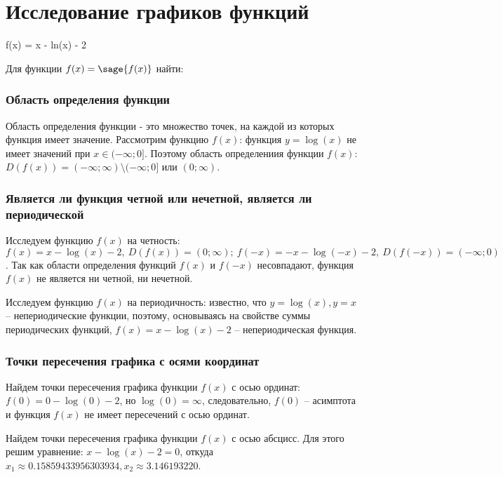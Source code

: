 \documentclass[14pt]{extreport}
\begin{document}
\tableofcontents

\newpage
\section{Исследование графиков функций}

\begin{sagesilent}
    f(x) = x - ln(x) - 2
\end{sagesilent}

Для функции $f(x) = \sage{f(x)}$ найти:

\subsubsection{Область определения функции}

Область определения функции - это множество точек, на каждой из которых функция имеет значение. Рассмотрим
функцию $f(x)$: функция $y = \log{(x)}$ не имеет значений при $x \in (-\infty;0]$. Поэтому
область определениия функции $f(x)$: $D(f(x)) = (-\infty;\infty)\setminus(-\infty;0]$ или $(0;\infty)$.

\subsubsection{Является ли функция четной или нечетной, является ли периодической}

Исследуем функцию $f(x)$ на четность: $f(x) = x - \log{(x)} - 2, ~D(f(x)) = (0;\infty);~
f(-x) = -x - \log{(-x)} - 2,~D(f(-x)) = (-\infty;0)$. Так как области определения функций $f(x)$ и $f(-x)$
несовпадают, функция $f(x)$ не является ни четной, ни нечетной.

Исследуем функцию $f(x)$ на периодичность: известно, что $y = \log{(x)}, y = x$ -- непериодические функции,
поэтому, основываясь на свойстве суммы периодических функций, $f(x) = x - \log{(x)} - 2$ -- непериодическая
функция.

\subsubsection{Точки пересечения графика с осями координат}

Найдем точки пересечения графика функции $f(x)$ с осью ординат: $f(0) = 0 - \log{(0)} - 2$, но $\log{(0)} =
\infty$, следовательно, $f(0)$ -- асимптота и функция $f(x)$ не имеет пересечений с осью ординат.

Найдем точки пересечения графика функции $f(x)$ с осью абсцисс. Для этого решим уравнение: $x - \log{(x)} -
2 = 0$, откуда $x_1 \approx 0.15859433956303934, x_2 \approx 3.146193220$.
\end{document}

